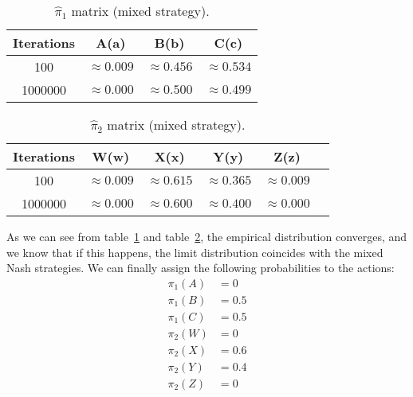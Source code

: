 \begin{table}[H]
    \centering
    \begin{tabular}{|c|c|c|c|}
        \hline
        \textbf{Iterations}& \textbf{A(a)} & \textbf{B(b)} & \textbf{C(c)} \\
        \hline
        100 & $\approx0.009$ & $\approx0.456$ & $\approx0.534$ \\
        \hline
        1000000 & $\approx0.000$ & $\approx0.500$ & $\approx0.499$ \\
        \hline
    \end{tabular}
    \caption{$\hat{\pi}_1$ matrix (mixed strategy).}
    \label{tab: player_1_mixed_strategy}
\end{table}

\begin{table}[H]
    \centering
    \begin{tabular}{|c|c|c|c|c|c|}
        \hline
        \textbf{Iterations} & \textbf{W(w)} & \textbf{X(x)} & \textbf{Y(y)} & \textbf{Z(z)} \\
        \hline
        100 & $\approx0.009$ & $\approx0.615$ & $\approx0.365$ & $\approx0.009$ \\
        \hline
        1000000 & $\approx0.000$ & $\approx0.600$ & $\approx0.400$ & $\approx0.000$ \\
        \hline
    \end{tabular}
    \caption{$\hat{\pi}_2$ matrix (mixed strategy).}
    \label{tab: player_2_mixed_strategy}
\end{table}
As we can see from table~\ref{tab: player_1_mixed_strategy} and table~\ref{tab: player_2_mixed_strategy}, the
empirical distribution converges, and we know that if this happens, the limit distribution coincides with the mixed
Nash strategies.
We can finally assign the following probabilities to the actions:
\begin{align*}
    \pi_1(A) &= 0 \\
    \pi_1(B) &= 0.5 \\
    \pi_1(C) &= 0.5 \\
    \pi_2(W) &= 0 \\
    \pi_2(X) &= 0.6 \\
    \pi_2(Y) &= 0.4 \\
    \pi_2(Z) &= 0
\end{align*}